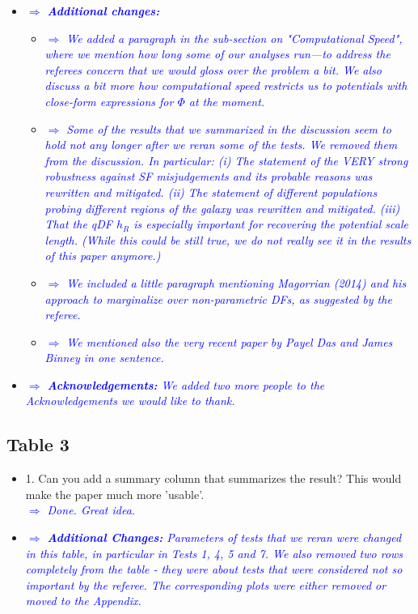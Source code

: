 \documentclass[10pt,a4paper]{article}
\newcommand{\Comment}[1]{\textsl{\textcolor{Blue}{$\Longrightarrow$ {#1}}}}
\begin{document}
\begin{itemize}
\item \Comment{\textbf{Additional changes:}}
\begin{itemize}
\item \Comment{We added a paragraph in the sub-section on "Computational Speed", where we mention how long some of our analyses run---to address the referees concern that we would gloss over the problem a bit. We also discuss a bit more how computational speed restricts us to potentials with close-form expressions for $\Phi$ at the moment.}
\item  \Comment{Some of the results that we summarized in the discussion seem to hold not any longer after we reran some of the tests. We removed them from the discussion. In particular: (i) The statement of the VERY strong robustness against SF misjudgements and its probable reasons was rewritten and mitigated. (ii) The statement of different populations probing different regions of the galaxy was rewritten and mitigated. (iii) That the qDF $h_R$ is especially important for recovering the potential scale length. (While this could be still true, we do not really see it in the results of this paper anymore.)}
\item  \Comment{We included a little paragraph mentioning Magorrian (2014) and his approach to marginalize over non-parametric DFs, as suggested by the referee.}
\item  \Comment{We mentioned also the very recent paper by Payel Das and James Binney in one sentence.}
\end{itemize}
\item \Comment{\textbf{Acknowledgements:} We added two more people to the Acknowledgements we would like to thank.}
\end{itemize}

\subsection{Table 3}
\begin{itemize}
\item 1. Can you add a summary column that summarizes the result? This would make the paper much more 'usable'. \\\Comment{Done. Great idea.}
\item \Comment{\textbf{Additional Changes:} Parameters of tests that we reran were changed in this table, in particular in Tests 1, 4, 5 and 7. We also removed two rows completely from the table - they were about tests that were considered not so important by the referee. The corresponding plots were either removed or moved to the Appendix.}
\end{itemize}
\end{document}

